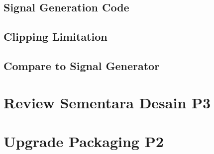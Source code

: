 \documentclass[table,dvipsnames]{beamer}
\begin{document}
	\subsection{Signal Generation Code}
	
	\subsection{Clipping Limitation}
	
	\subsection{Compare to Signal Generator}
	
	\section {Review Sementara Desain P3}
	
	\section{Upgrade Packaging P2}
\end{document}
